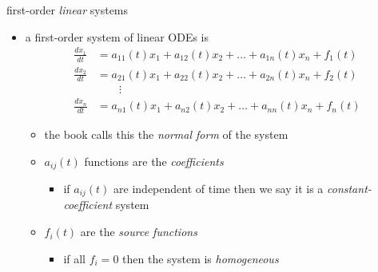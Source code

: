 \documentclass[urlcolor=blue,dvipsnames]{beamer}
\begin{document}
\begin{frame}{first-order \emph{linear} systems}

\begin{itemize}
\item a \alert{first-order system of linear ODEs} is
\begin{align*}
\frac{dx_1}{dt} &= a_{11}(t) x_1 + a_{12}(t) x_2 + \dots + a_{1n}(t) x_n + f_1(t) \\
\frac{dx_2}{dt} &= a_{21}(t) x_1 + a_{22}(t) x_2 + \dots + a_{2n}(t) x_n + f_2(t) \\
                &\qquad \vdots \\
\frac{dx_n}{dt} &= a_{n1}(t) x_1 + a_{n2}(t) x_2 + \dots + a_{nn}(t) x_n + f_n(t)
\end{align*}
     \begin{itemize}
     \item the book calls this the \emph{normal form} of the system

\smallskip
     \item $a_{ij}(t)$ functions are the \emph{coefficients}
         \begin{itemize}
         \item if $a_{ij}(t)$ are independent of time then we say it is a \emph{constant-coefficient} system
         \end{itemize}
     \item $f_i(t)$ are the \emph{source functions}
         \begin{itemize}
         \item if all $f_i=0$ then the system is \emph{homogeneous}
         \end{itemize}
     \end{itemize}
\end{itemize}
\end{frame}
\end{document}
